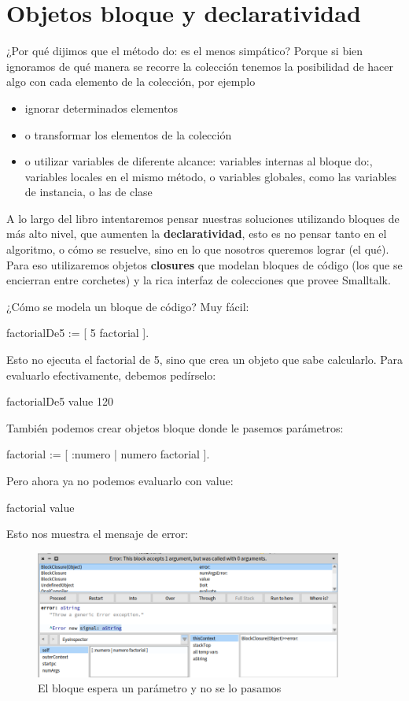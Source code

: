 \documentclass[a4paper,12pt]{book}
\begin{document}
\section{Objetos bloque y declaratividad}
¿Por qué dijimos que el método do: es el menos simpático? Porque si bien ignoramos de qué manera se recorre la
colección tenemos la posibilidad de hacer algo con cada elemento de la colección, por ejemplo
\begin{itemize}
 \item ignorar determinados elementos
 \item o transformar los elementos de la colección
 \item o utilizar variables de diferente alcance: variables internas al bloque do:, variables locales en el mismo
 método, o variables globales, como las variables de instancia, o las de clase
\end{itemize}
A lo largo del libro intentaremos pensar nuestras soluciones utilizando bloques de más alto nivel, que aumenten
la \textbf{declaratividad}, esto es no pensar tanto en el algoritmo, o cómo se resuelve, sino en lo que nosotros
queremos lograr (el qué). Para eso utilizaremos objetos \textbf{closures} que modelan bloques de código 
(los que se encierran entre corchetes) y la rica interfaz de colecciones que provee Smalltalk.

¿Cómo se modela un bloque de código? Muy fácil:
\begin{code}
factorialDe5 := [ 5 factorial ].
\end{code}

Esto no ejecuta el factorial de 5, sino que crea un objeto que sabe calcularlo. Para evaluarlo efectivamente, 
debemos pedírselo:
\begin{code}
factorialDe5 value
    120
\end{code}

También podemos crear objetos bloque donde le pasemos parámetros:
\begin{code}
factorial := [ :numero | numero factorial ].
\end{code}

Pero ahora ya no podemos evaluarlo con value:
\begin{code}
factorial value
\end{code}

Esto nos muestra el mensaje de error:

\begin{figure}[h!]
    \centering	
    \includegraphics[width=0.9\textwidth]{images/17_error_bloque.png}
    \caption{El bloque espera un parámetro y no se lo pasamos}
\end{figure}
\FloatBarrier
\end{document}
